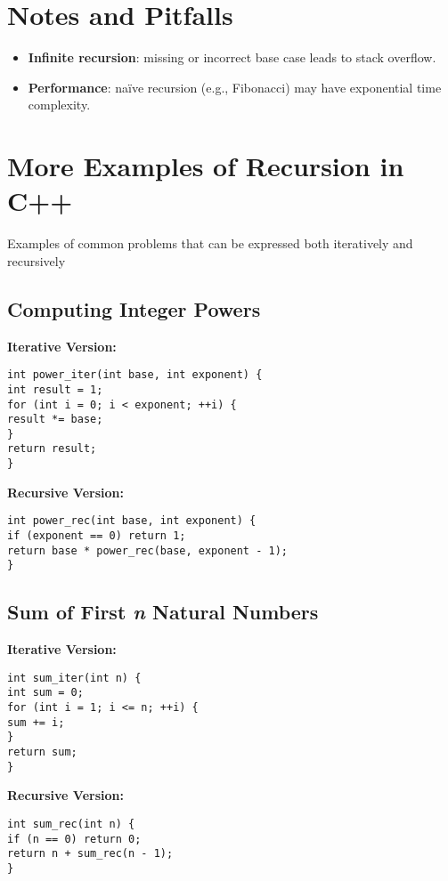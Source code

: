 \documentclass{article}
\begin{document}
\section{Notes and Pitfalls}
\begin{itemize}
  \item \textbf{Infinite recursion}: missing or incorrect base case leads to stack overflow.
  \item \textbf{Performance}: naïve recursion (e.g., Fibonacci) may have exponential time complexity.
\end{itemize}


\section{More Examples of Recursion in C++}

Examples of common problems that can be expressed both iteratively and recursively

\subsection{Computing Integer Powers}

\textbf{Iterative Version:}
\begin{lstlisting}[style=cppstyle]
int power_iter(int base, int exponent) {
int result = 1;
for (int i = 0; i < exponent; ++i) {
result *= base;
}
return result;
}
\end{lstlisting}

\textbf{Recursive Version:}
\begin{lstlisting}[style=cppstyle]
int power_rec(int base, int exponent) {
if (exponent == 0) return 1;
return base * power_rec(base, exponent - 1);
}
\end{lstlisting}



\subsection{Sum of First \textit{n} Natural Numbers}

\textbf{Iterative Version:}
\begin{lstlisting}[style=cppstyle]
int sum_iter(int n) {
int sum = 0;
for (int i = 1; i <= n; ++i) {
sum += i;
}
return sum;
}
\end{lstlisting}

\textbf{Recursive Version:}
\begin{lstlisting}[style=cppstyle]
int sum_rec(int n) {
if (n == 0) return 0;
return n + sum_rec(n - 1);
}
\end{lstlisting}
\end{document}
